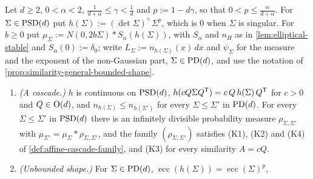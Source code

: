 \begin{proposition}
\label{prop:similarity-degenerate-family}
\leanok
Let $d \ge 2$, $0 < \alpha < 2$, $\tfrac{1}{d+\alpha} \le \gamma < \tfrac1d$ and $p := 1 - d\gamma$, so that
$0 < p \le \tfrac{\alpha}{d+\alpha}$. For $\Sigma \in \mathrm{PSD}(d)$ put $h(\Sigma) := (\det\Sigma)^\gamma\,\Sigma^p$,
which is $0$ when $\Sigma$ is singular. For $b \ge 0$ put
$\mu_\Sigma := N(0,2b\Sigma) * S_\alpha(h(\Sigma))$, with $S_\alpha$ and $n_H$ as in
\ref{lem:elliptical-stable} and $S_\alpha(0) := \delta_0$; write $L_\Sigma := n_{h(\Sigma)}(x)\,dx$ and
$\psi_\Sigma$ for the \Levy{} measure and the exponent of the non-Gaussian part, $\Sigma \in \mathrm{PD}(d)$, and
use the notation of \ref{prop:similarity-general-bounded-shape}.
\begin{enumerate}
\item \emph{(A cascade.)} $h$ is continuous on $\mathrm{PSD}(d)$, $h(cQ\Sigma Q^{\mathsf{T}}) = c\,Q\,h(\Sigma)\,Q^{\mathsf{T}}$ for
$c > 0$ and $Q \in \mathrm{O}(d)$, and $n_{h(\Sigma)} \le n_{h(\Sigma')}$ for every $\Sigma \le \Sigma'$ in $\mathrm{PD}(d)$.
For every $\Sigma \le \Sigma'$ in $\mathrm{PSD}(d)$ there is an infinitely divisible probability measure
$\rho_{\Sigma,\Sigma'}$ with $\mu_{\Sigma'} = \mu_\Sigma * \rho_{\Sigma,\Sigma'}$, and the family
$(\rho_{\Sigma,\Sigma'})$ satisfies (K1), (K2) and (K4) of \ref{def:affine-cascade-family}, and (K3) for
every similarity $A = cQ$.
\item \emph{(Unbounded shape.)} For $\Sigma \in \mathrm{PD}(d)$, $\operatorname{ecc}(h(\Sigma)) = \operatorname{ecc}(\Sigma)^p$,

\end{enumerate}
\end{proposition}
